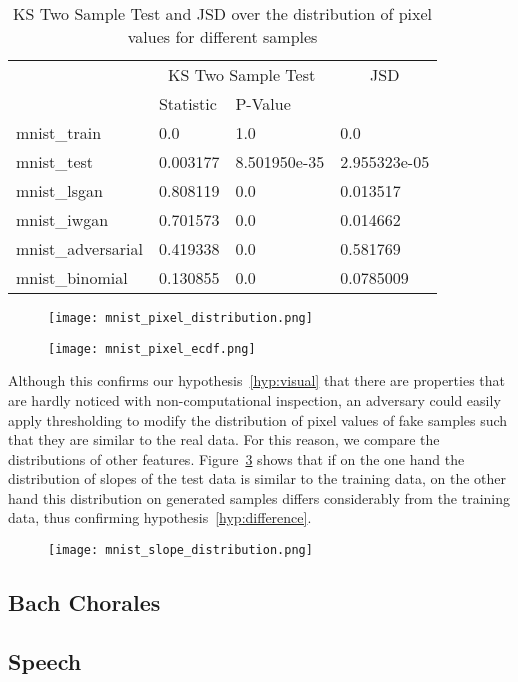 \begin{table}[!h]
\centering
\caption{KS Two Sample Test and JSD over the distribution of pixel values for
different samples}
\label{tbl:mnist_pixel}
\begin{tabular}{l|ll|l|}
                   & \multicolumn{2}{c|}{\cellcolor[HTML]{C0C0C0}KS Two Sample Test} & \multicolumn{1}{c|}{\cellcolor[HTML]{C0C0C0}JSD} \\
                   & Statistic   & P-Value        &                \\
mnist\_train       & 0.0         & 1.0            & 0.0            \\
mnist\_test        & 0.003177    & 8.501950e-35   & 2.955323e-05   \\
mnist\_lsgan       & 0.808119    & 0.0            & 0.013517       \\
mnist\_iwgan       & 0.701573    & 0.0            & 0.014662       \\
mnist\_adversarial & 0.419338    & 0.0            & 0.581769       \\
mnist\_binomial    & 0.130855    & 0.0            & 0.0785009      
\end{tabular}
\end{table}


\begin{figure}[!h]
  \texttt{[image: mnist\_pixel\_distribution.png]}
  \caption{}
  \label{fig:mnist_pixel_distribution}
\end{figure}


\begin{figure}[!h]
  \texttt{[image: mnist\_pixel\_ecdf.png]}
  \caption{}
  \label{fig:mnist_pixel_ecdf}
\end{figure}


Although this confirms our hypothesis~\ref{hyp:visual} that there are properties
that are hardly noticed with non-computational inspection, an adversary could
easily apply thresholding to modify the distribution of pixel values of fake
samples such that they are similar to the real data. For this reason, we compare the
distributions of other features. Figure~\ref{fig:mnist_slope_distribution} shows
that if on the one hand the distribution of slopes of the test data is similar to the
training data, on the other hand this distribution on generated samples differs
considerably from the training data, thus confirming hypothesis~\ref{hyp:difference}.

\begin{figure}
  \texttt{[image: mnist\_slope\_distribution.png]}
  \caption{}
  \label{fig:mnist_slope_distribution}
\end{figure}

\subsection{Bach Chorales}
\subsection{Speech}
